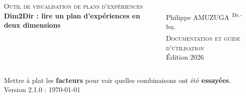 \begin{frame}[plain]
\vfill
\color{gray!50!black}
\begin{columns}[t,totalwidth=\textwidth]
\raggedright
\textsc{\large Outil de visualisation de plans d'expériences}\\[0.5ex]
\textbf{\LARGE Dim2Dir : lire un plan d'expériences en deux dimensions}\\[0.4ex]
\rule{\linewidth}{0.9pt}\\[1.0ex]
{\large Philippe AMUZUGA\textsuperscript{\footnotesize~Dr.-Ing.}}\\[0.3ex]
\vspace{0.4ex}
{\footnotesize \textsc{Documentation et guide d'utilisation}\\Édition 2026}
\end{columns}
\vspace*{0.7cm}
\begin{center}
{\small Mettre à plat les \textbf{\color{blue}facteurs} pour voir quelles combinaisons ont été \textbf{\color{red}essayées}.}\\[0.5cm]
{\footnotesize Version 2.1.0 : \monthyearformat\today}
\end{center}
\end{frame}
\renewcommand{\shortTitle}{\tiny Dim2Dir : lire un plan en 2D / Édition 2026 / Philippe AMUZUGA}
